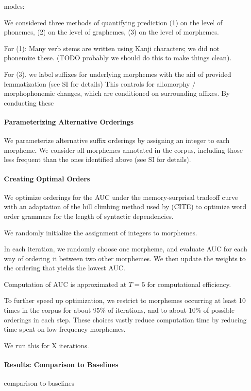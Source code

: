 modes:

We considered three methods of quantifying prediction
(1) on the level of phonemes, (2) on the level of graphemes, (3) on the level of morphemes.

For (1): Many verb stems are written using Kanji characters; we did not phonemize these. (TODO probably we should do this to make things clean).


For (3), we label suffixes for underlying morphemes with the aid of provided lemmatization (see SI for details)
This controls for allomorphy / morphophonemic changes, which are conditioned on surrounding affixes.
By conducting these 

\paragraph{Parameterizing Alternative Orderings}

We parameterize alternative suffix orderings by assigning an integer to each morpheme.
We consider all morphemes annotated in the corpus, including those less frequent than the ones identified above (see SI for details).

\paragraph{Creating Optimal Orders}

We optimize orderings for the AUC under the memory-surprisal tradeoff curve with an adaptation of the hill climbing method used by (CITE) to optimize word order grammars for the length of syntactic dependencies.

We randomly initialize the assignment of integers to morphemes.

In each iteration, we randomly choose one morpheme, and evaluate AUC for each way of ordering it between two other morphemes.
We then update the weights to the ordering that yields the lowest AUC.

Computation of AUC is approximated at $T=5$ for computational efficiency.

To further speed up optimization, we restrict to morphemes occurring at least 10 times in the corpus for about 95\% of iterations, and to about 10\% of possible orderings in each step.
These choices vastly reduce computation time by reducing time spent on low-frequency morphemes.

We run this for X iterations.

\paragraph{Results: Comparison to Baselines}
comparison to baselines

